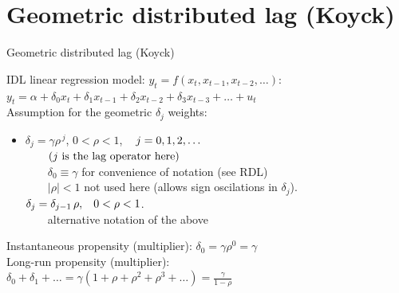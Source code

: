 \documentclass{beamer}
\begin{document}
\section{Geometric distributed lag (Koyck) }
\begin{frame}{Geometric distributed lag (Koyck) }

IDL linear regression model: $y_t = f(x_t, x_{t-1}, x_{t-2}, \dots)$: 
\\ \vspace{0.3cm}
$ y_t = \alpha + \delta_0 x_t + \delta_1 x_{t-1} + \delta_2 x_{t-2} + \delta_3 x_{t-3} 
+ \dots + u_t$ \\ \vspace{0.3cm}
Assumption for the geometric $\delta_j$ weights:
\begin{itemize}
\item $ \delta_{j} = \gamma \rho^{\,j}$, \hspace{0.3cm} $0 < \rho < 1 $, $\hspace{0.3cm} j=0,1,2,\dots $\\
\smallskip
~~~~$\left( j \textnormal{~is the lag operator here} \right)$\\
~~~~$\delta_0 \equiv \gamma$ for convenience of notation (see RDL)\\
~~~~$|\rho|<1$ not used here (allows sign oscilations in $ \delta_{j}$).\\
\smallskip
$\delta_j = \delta_{j-1}\, \rho, \hspace{0.3cm} 0 < \rho < 1 $.\\
~~~~alternative notation of the above 
\end{itemize}
 
\vspace{0.3cm}
Instantaneous propensity (multiplier): $ \delta_0 = \gamma \rho^0 = \gamma$ 
\\ \vspace{0.3cm}
Long-run propensity (multiplier):
\\ \vspace{0.3cm}
$\delta_0+\delta_1+\dots=\gamma(1+\rho+\rho^2+\rho^3+\dots)=\frac{\gamma}{1-\rho}$

\end{frame}
\end{document}

